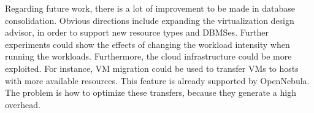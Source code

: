 Regarding future work, there is a lot of improvement to be made in database consolidation. Obvious directions include expanding the virtualization design advisor, in order to support new resource types and DBMSes. Further experiments could show the effects of changing the workload intensity when running the workloads. Furthermore, the cloud infrastructure could be more exploited. For instance, VM migration could be used to transfer VMs to hosts with more available resources.  This feature is already supported by OpenNebula. The problem is how to optimize these transfers, because they generate a high overhead. 

